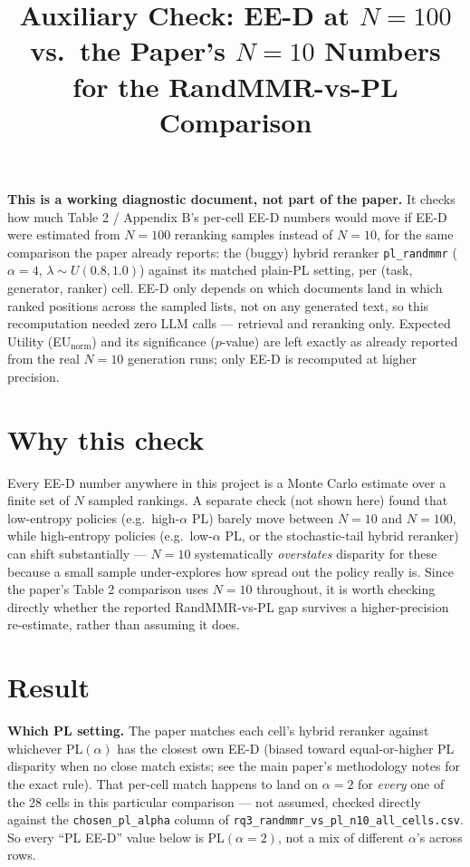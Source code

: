 \documentclass[10pt]{article}
\title{Auxiliary Check: EE-D at $N{=}100$ vs.\ the Paper's $N{=}10$ Numbers\\for the RandMMR-vs-PL Comparison}
\author{}
\date{}
\begin{document}
\maketitle

\noindent\textbf{This is a working diagnostic document, not part of the paper.} It
checks how much Table 2 / Appendix B's per-cell EE-D numbers would move if EE-D were
estimated from $N{=}100$ reranking samples instead of $N{=}10$, for the same
comparison the paper already reports: the (buggy) hybrid reranker
\texttt{pl\_randmmr} ($\alpha{=}4$, $\lambda\sim U(0.8,1.0)$) against its matched
plain-PL setting, per (task, generator, ranker) cell. EE-D only depends on which
documents land in which ranked positions across the sampled lists, not on any
generated text, so this recomputation needed zero LLM calls --- retrieval and
reranking only. Expected Utility (EU$_{\text{norm}}$) and its significance ($p$-value)
are left exactly as already reported from the real $N{=}10$ generation runs; only
EE-D is recomputed at higher precision.

\section{Why this check}

Every EE-D number anywhere in this project is a Monte Carlo estimate over a finite
set of $N$ sampled rankings. A separate check (not shown here) found that low-entropy
policies (e.g.\ high-$\alpha$ PL) barely move between $N{=}10$ and $N{=}100$, while
high-entropy policies (e.g.\ low-$\alpha$ PL, or the stochastic-tail hybrid reranker)
can shift substantially --- $N{=}10$ systematically \emph{overstates} disparity for
these because a small sample under-explores how spread out the policy really is. Since
the paper's Table 2 comparison uses $N{=}10$ throughout, it is worth checking directly
whether the reported RandMMR-vs-PL gap survives a higher-precision re-estimate, rather
than assuming it does.

\section{Result}

\noindent\textbf{Which PL setting.} The paper matches each cell's hybrid reranker
against whichever PL$(\alpha)$ has the closest own EE-D (biased toward equal-or-higher
PL disparity when no close match exists; see the main paper's methodology notes for
the exact rule). That per-cell match happens to land on $\alpha{=}2$ for \emph{every}
one of the 28 cells in this particular comparison --- not assumed, checked directly
against the \texttt{chosen\_pl\_alpha} column of
\texttt{rq3\_randmmr\_vs\_pl\_n10\_all\_cells.csv}. So every ``PL EE-D'' value below is
PL$(\alpha{=}2)$, not a mix of different $\alpha$'s across rows.
\end{document}
